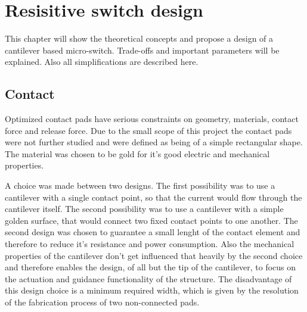 \section{Resisitive switch design}
\label{sec:resisitive_switch_design}
This chapter will show the theoretical concepts and propose a design of a cantilever based micro-switch.
Trade-offs and important parameters will be explained.
Also all simplifications are described here.

\subsection{Contact}
\label{sec:contact}
Optimized contact pads have serious constraints on geometry, materials, contact force and release force. 
Due to the small scope of this project the contact pads were not further studied and were defined as being of a simple rectangular shape.
The material was chosen to be gold for it's good electric and mechanical properties. 

A choice was made between two designs.
The first possibility was to use a cantilever with a single contact point, so that the current would flow through the cantilever itself. %
The second possibility was to use a cantilever with a simple golden surface, that would connect two fixed contact points to one another. %
The second design was chosen to guarantee a small lenght of the contact element and therefore to reduce it's resistance and power consumption.
Also the mechanical properties of the cantilever don't get influenced that heavily by the second choice and therefore enables the design, of all but the tip of the cantilever, to focus on the actuation and guidance functionality of the structure.
The disadvantage of this design choice is a minimum required width, which is given by the resolution of the fabrication process of two non-connected pads.
  

